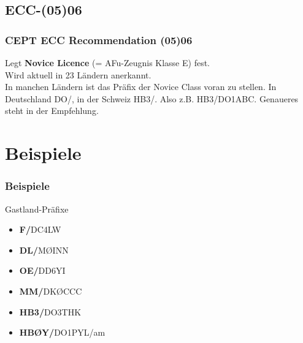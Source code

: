 \subsection{ECC-(05)06}

\begin{frame}
    \frametitle{CEPT ECC Recommendation (05)06}

    Legt \textbf{Novice Licence} (= AFu-Zeugnis Klasse E) fest. \\[2em]

    Wird aktuell in 23 Ländern anerkannt.\\[2em]

    In manchen Ländern ist das Präfix der Novice Class voran zu stellen. In
    Deutschland DO/, in der Schweiz HB3/. Also z.B. HB3/DO1ABC. Genaueres steht
    in der Empfehlung.

\end{frame}

\section{Beispiele}

\begin{frame}
  \frametitle{Beispiele}
    \begin{exampleblock}{Gastland-Präfixe}
    \begin{itemize}
       \item \textbf{F/}DC4LW
       \item \textbf{DL/}M\O INN
       \item \textbf{OE/}DD6YI
       \item \textbf{MM/}DK\O CCC
       \item \textbf{HB3/}DO3THK
       \item \textbf{HB\O Y/}DO1PYL/am
    \end{itemize}
  \end{exampleblock}
\end{frame}

